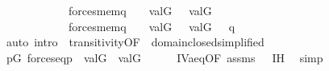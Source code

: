 \begin{isabellebody}
\ \ \ \ \ \ \ \ \ \ \ \ {\isacharparenleft}{\kern0pt}forces{\isacharunderscore}{\kern0pt}mem{\isacharparenleft}{\kern0pt}q{\isacharcomma}{\kern0pt}\ {\isasymsigma}{\isacharcomma}{\kern0pt}\ {\isasymtau}{\isacharparenright}{\kern0pt}\ {\isasymlongrightarrow}\ val{\isacharparenleft}{\kern0pt}G{\isacharcomma}{\kern0pt}\ {\isasymsigma}{\isacharparenright}{\kern0pt}\ {\isasymin}\ val{\isacharparenleft}{\kern0pt}G{\isacharcomma}{\kern0pt}\ {\isasymtau}{\isacharparenright}{\kern0pt}{\isacharparenright}{\kern0pt}\ {\isasymand}\ \isanewline
\ \ \ \ \ \ \ \ \ \ \ \ {\isacharparenleft}{\kern0pt}forces{\isacharunderscore}{\kern0pt}mem{\isacharparenleft}{\kern0pt}q{\isacharcomma}{\kern0pt}\ {\isasymsigma}{\isacharcomma}{\kern0pt}\ {\isasymtheta}{\isacharparenright}{\kern0pt}\ {\isasymlongrightarrow}\ val{\isacharparenleft}{\kern0pt}G{\isacharcomma}{\kern0pt}\ {\isasymsigma}{\isacharparenright}{\kern0pt}\ {\isasymin}\ val{\isacharparenleft}{\kern0pt}G{\isacharcomma}{\kern0pt}\ {\isasymtheta}{\isacharparenright}{\kern0pt}{\isacharparenright}{\kern0pt}{\isachardoublequoteclose}\ \ q\ {\isasymsigma}\ \isanewline
\ \ \ \ \isamarkupfalse%
\ {\isacharparenleft}{\kern0pt}auto\ intro{\isacharcolon}{\kern0pt}\ \ transitivity{\isacharbrackleft}{\kern0pt}OF\ {\isacharunderscore}{\kern0pt}\ domain{\isacharunderscore}{\kern0pt}closed{\isacharbrackleft}{\kern0pt}simplified{\isacharbrackright}{\kern0pt}{\isacharbrackright}{\kern0pt}{\isacharparenright}{\kern0pt}\isanewline
\ \ \isamarkupfalse%
\isanewline
\ \ \isamarkupfalse%
\ {\isachardoublequoteopen}{\isasymforall}p{\isasymin}G{\isachardot}{\kern0pt}\ forces{\isacharunderscore}{\kern0pt}eq{\isacharparenleft}{\kern0pt}p{\isacharcomma}{\kern0pt}{\isasymtau}{\isacharcomma}{\kern0pt}{\isasymtheta}{\isacharparenright}{\kern0pt}\ {\isasymlongrightarrow}\ val{\isacharparenleft}{\kern0pt}G{\isacharcomma}{\kern0pt}{\isasymtau}{\isacharparenright}{\kern0pt}\ {\isacharequal}{\kern0pt}\ val{\isacharparenleft}{\kern0pt}G{\isacharcomma}{\kern0pt}{\isasymtheta}{\isacharparenright}{\kern0pt}{\isachardoublequoteclose}\isanewline
\ \ \ \ \isamarkupfalse%
\ IV{}{}{}a{\isacharunderscore}{\kern0pt}eq{\isacharbrackleft}{\kern0pt}OF\ assms{\isacharparenleft}{\kern0pt}{}{\isacharparenright}{\kern0pt}\ {\isacharunderscore}{\kern0pt}\ {\isacharunderscore}{\kern0pt}\ IH{\isacharprime}{\kern0pt}{\isacharbrackright}{\kern0pt}\ \isamarkupfalse%
\ {\isacharparenleft}{\kern0pt}simp{\isacharparenright}{\kern0pt}\isanewline

\end{isabellebody}
